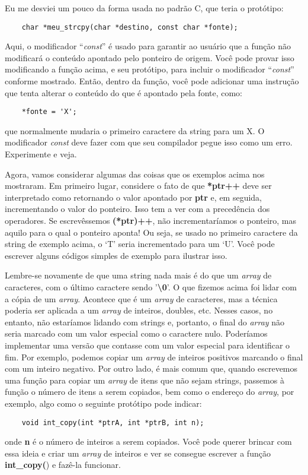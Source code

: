 Eu me desviei um pouco da forma usada no padrão C, que teria o protótipo:
\begin{lstlisting}
	char *meu_strcpy(char *destino, const char *fonte);
\end{lstlisting}

Aqui, o modificador ``\textit{const}'' é usado para garantir ao usuário que a função não modificará o conteúdo apontado pelo ponteiro de origem. Você pode provar isso modificando a função acima, e seu protótipo, para incluir o modificador ``\textit{const}''  conforme mostrado. Então, dentro da função, você pode adicionar uma instrução que tenta alterar o conteúdo do que é apontado pela fonte, como:
\begin{lstlisting}
	*fonte = 'X';
\end{lstlisting}
que normalmente mudaria o primeiro caractere da string para um X. O modificador \textit{const} deve fazer com que seu compilador pegue isso como um erro. Experimente e veja.

Agora, vamos considerar algumas das coisas que os exemplos acima nos mostraram. Em primeiro lugar, considere o fato de que \textbf{*ptr++} deve ser interpretado como retornando o valor apontado por \textbf{ptr} e, em seguida, incrementando o valor do ponteiro. Isso tem a ver com a precedência dos operadores. Se escrevêssemos \textbf{(*ptr)++}, não incrementaríamos o ponteiro, mas aquilo para o qual o ponteiro aponta! Ou seja, se usado no primeiro caractere da string de exemplo acima, o `T' seria incrementado para um `U'. Você pode escrever alguns códigos simples de exemplo  para ilustrar isso.

Lembre-se novamente de que uma string nada mais é do que um \textit{array} de caracteres, com o último caractere sendo '\textbf{\textbackslash0}'. O que fizemos acima foi lidar com a cópia de um \textit{array}. Acontece que é um \textit{array} de caracteres, mas a técnica poderia ser aplicada a um \textit{array} de inteiros, doubles, etc. Nesses casos, no entanto, não estaríamos lidando com strings e, portanto, o final do \textit{array} não seria marcado com um valor especial como o caractere nulo. Poderíamos implementar uma versão que contasse com um valor especial para identificar o fim. Por exemplo, podemos copiar um \textit{array} de inteiros positivos marcando o final com um inteiro negativo. Por outro lado, é mais comum que, quando escrevemos uma função para copiar um \textit{\textit{array}} de itens que não sejam strings, passemos à função o número de itens a serem copiados, bem como o endereço do \textit{array}, por exemplo, algo como o seguinte protótipo pode indicar:
\begin{lstlisting}
	void int_copy(int *ptrA, int *ptrB, int n);
\end{lstlisting}
onde \textbf{n} é o número de inteiros a serem copiados. Você pode querer brincar com essa ideia e criar um \textit{array} de inteiros e ver se consegue escrever a função \textbf{int\_copy(}) e fazê-la funcionar.

